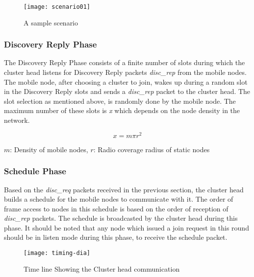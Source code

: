 \begin{figure}[h]{} %
  \begin{center}
   \texttt{[image: scenario01]}
	 \caption{A sample scenario}
	 \label{fig:scenario01}
  \end{center}
\end{figure}


\subsubsection{Discovery Reply Phase}
\label{disc_rep_phase}
The Discovery Reply Phase consists of a finite number of slots during which the cluster head listens for Discovery Reply packets \emph{disc\_rep} from the mobile nodes. The mobile node, after choosing a cluster to join, wakes up during a random slot in the Discovery Reply slots and sends a \emph{disc\_rep} packet to the cluster head. The slot selection as mentioned above, is randomly done by the mobile node. The maximum number of these slots is \emph{x} which depends on the node density in the network.

\begin{equation}
	x = m\pi r^2 
	\label{eqn:x}
\end{equation}

$m$: Density of mobile nodes, $r$: Radio coverage radius of static nodes\\

\subsubsection{Schedule Phase}
\label{sched_phase}
Based on the \emph{disc\_req} packets received in the previous section, the cluster head builds a schedule for the mobile nodes to communicate with it. The order of frame access to nodes in this schedule is based on the order of reception of \emph{disc\_rep} packets. The schedule is broadcasted by the cluster head during this phase. It should be noted that any node which issued a join request in this round should be in listen mode during this phase, to receive the schedule packet. 

\begin{figure}[h]{} 
  \begin{center}
    \texttt{[image: timing-dia]}
  \end{center}
  \caption{Time line Showing the Cluster head communication}
	\label{fig:timing}
\end{figure}


